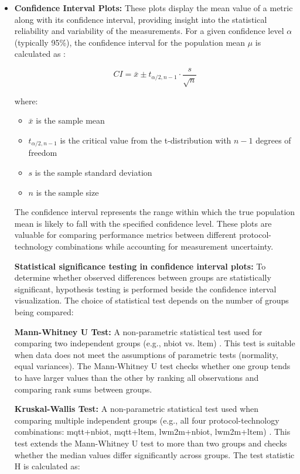 \documentclass[12pt, english, openany]{book}
\begin{document}
\begin{itemize}
    \item \textbf{Confidence Interval Plots:} These plots display the mean value of a metric along with its confidence interval, providing insight into the statistical reliability and variability of the measurements. For a given confidence level $\alpha$ (typically 95\%), the confidence interval for the population mean $\mu$ is calculated as \parencite{CONFIDENCE_INTERVAL}:

          \[
              CI = \bar{x} \pm t_{\alpha/2, n-1} \cdot \frac{s}{\sqrt{n}}
          \]

          where:
          \begin{itemize}
              \item $\bar{x}$ is the sample mean
              \item $t_{\alpha/2, n-1}$ is the critical value from the t-distribution with $n-1$ degrees of freedom
              \item $s$ is the sample standard deviation
              \item $n$ is the sample size
          \end{itemize}

          The confidence interval represents the range within which the true population mean is likely to fall with the specified confidence level. These plots are valuable for comparing performance metrics between different protocol-technology combinations while accounting for measurement uncertainty.

          \textbf{Statistical significance testing in confidence interval plots:} To determine whether observed differences between groups are statistically significant, hypothesis testing is performed beside the confidence interval visualization. The choice of statistical test depends on the number of groups being compared:

          \textbf{Mann-Whitney U Test:} A non-parametric statistical test used for comparing two independent groups (e.g., \gls{nbiot} vs. \gls{ltem}) \parencite{MANN_WHITNEY_U_TEST}. This test is suitable when data does not meet the assumptions of parametric tests (normality, equal variances). The Mann-Whitney U test checks whether one group tends to have larger values than the other by ranking all observations and comparing rank sums between groups.

          \textbf{Kruskal-Wallis Test:} A non-parametric statistical test used when comparing multiple independent groups (e.g., all four protocol-technology combinations: \gls{mqtt}+\gls{nbiot}, \gls{mqtt}+\gls{ltem}, \gls{lwm2m}+\gls{nbiot}, \gls{lwm2m}+\gls{ltem}) \parencite{KRUSKAL_WALLIS_TEST}. This test extends the Mann-Whitney U test to more than two groups and checks whether the median values differ significantly across groups. The test statistic H is calculated as:


\end{itemize}
\end{document}
